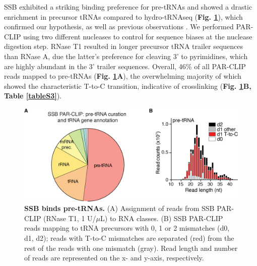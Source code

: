 \documentclass[12pt]{rockefeller}
\begin{document}
SSB exhibited a striking binding preference for pre-tRNAs and showed a drastic enrichment in precursor tRNAs compared to hydro-tRNAseq (\textbf{Fig. \ref{paper2cd}}), which confirmed our hypothesis, as well as previous observations \cite{Bayfield:2009cx}. We performed PAR-CLIP using two different nucleases to control for sequence biases at the nuclease digestion step. RNase T1 resulted in longer precursor tRNA trailer sequences than RNase A, due the latter’s preference for cleaving 3’ to pyrimidines, which are highly abundant in the 3’ trailer sequences. Overall, 46\% of all PAR-CLIP reads mapped to pre-tRNAs (\textbf{Fig. \ref{paper2cd}A}), the overwhelming majority of which showed the characteristic T-to-C transition, indicative of crosslinking (\textbf{Fig. \ref{paper2cd}B, Table \ref{tableS3}}).


\begin{figure}[!ht]%
\centering
\includegraphics[width=\textwidth]{paper2cd.png}%
\caption[SSB binds pre-tRNAs.]
{
\textbf{SSB binds pre-tRNAs.}
(A) Assignment of reads from SSB PAR-CLIP (RNase T1, 1 U/$\mu$L) to RNA classes. (B) SSB PAR-CLIP reads mapping to tRNA precursors with 0, 1 or 2 mismatches (d0, d1, d2); reads with T-to-C mismatches are separated (red) from the rest of the reads with one mismatch (gray). Read length and number of reads are represented on the x- and y-axis, respectively. 
}
\centering
\label{paper2cd}%
\end{figure}
\end{document}
